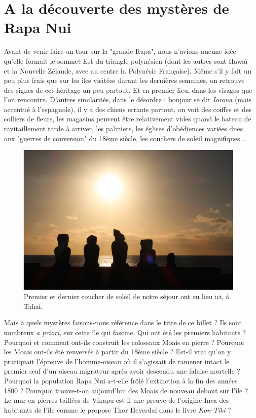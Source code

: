 \hypertarget{a-la-duxe9couverte-des-mystuxe8res-de-rapa-nui}{%
\section{A la découverte des mystères de Rapa
Nui}\label{a-la-duxe9couverte-des-mystuxe8res-de-rapa-nui}}

Avant de venir faire un tour sur la "grande Rapa", nous n'avions aucune
idée qu'elle formait le sommet Est du triangle polynésien (dont les
autres sont Hawaï et la Nouvelle Zélande, avec au centre la Polynésie
Française). Même s'il y fait un peu plus frais que sur les îles visitées
durant les dernières semaines, on retrouve des signes de cet héritage un
peu partout. Et en premier lieu, dans les visages que l'on rencontre.
D'autres similarités, dans le désordre : bonjour se dit \emph{Iorana}
(mais accentué à l'espagnole), il y a des chiens errants partout, on
voit des coiffes et des colliers de fleurs, les magasins peuvent être
relativement vides quand le bateau de ravitaillement tarde à arriver,
les palmiers, les églises d'obédiences variées dues aux "guerres de
conversion" du 18ème siècle, les couchers de soleil magnifiques...

\begin{figure}
\centering
\includegraphics{images/20180827_tahai.JPG}
\caption{Premier et dernier coucher de soleil de notre séjour ont eu
lieu ici, à Tahai.}
\end{figure}

Mais à quels mystères faisons-nous référence dans le titre de ce billet
? Ils sont nombreux \emph{a priori}, sur cette île qui fascine. Qui ont
été les premiers habitants ? Pourquoi et comment ont-ils construit les
colossaux Moais en pierre ? Pourquoi les Moais ont-ils été renversés à
partir du 18ème siècle ? Est-il vrai qu'on y pratiquait l'épreuve de
l'homme-oiseau où il s'agissait de ramener intact le premier œuf d'un
oiseau migrateur après avoir descendu une falaise mortelle ? Pourquoi la
population Rapa Nui a-t-elle frôlé l'extinction à la fin des années 1800
? Pourquoi trouve-t-on aujourd'hui des Moais de nouveau debout sur l'île
? Le mur en pierres taillées de Vinapu est-il une preuve de l'origine
Inca des habitants de l'île comme le propose Thor Heyerdal dans le livre
\emph{Kon-Tiki} ?

